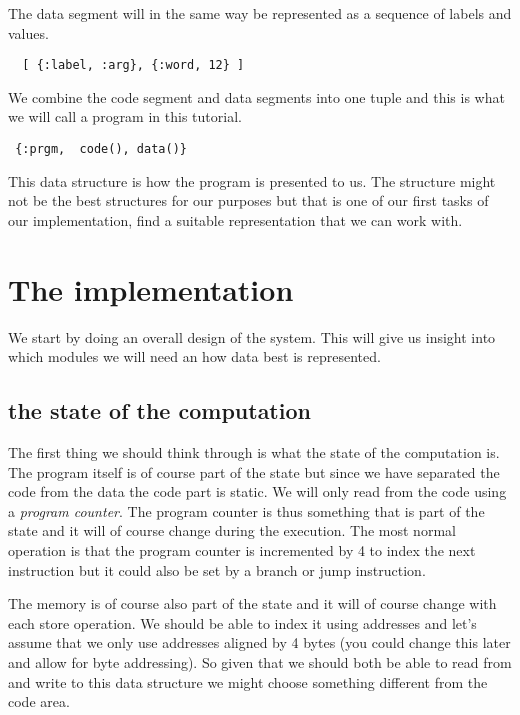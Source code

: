 \documentclass[a4paper,11pt]{article}
\begin{document}
The data segment will in the same way be represented as a sequence of
labels and values.

\begin{verbatim}
  [ {:label, :arg}, {:word, 12} ]
\end{verbatim}

We combine the code segment and data segments into one tuple and this
is what we will call a program in this tutorial.

\begin{verbatim}
 {:prgm,  code(), data()} 
\end{verbatim}

This data structure is how the program is presented to us. The
structure might not be the best structures for our purposes but that
is one of our first tasks of our implementation, find a suitable
representation that we can work with. 

\section{The implementation}

We start by doing an overall design of the system. This will give us
insight into which modules we will need an how data best is
represented.

\subsection{the state of the computation}

The first thing we should think through is what the state of the
computation is. The program itself is of course part of the state but
since we have separated the code from the data the code part is
static. We will only read from the code using a {\em program
  counter}. The program counter is thus something that is part of the
state and it will of course change during the execution. The most
normal operation is that the program counter is incremented by 4 to
index the next instruction but it could also be set by a branch or
jump instruction.

The memory is of course also part of the state and it will of course
change with each store operation. We should be able to index it using
addresses and let's assume that we only use addresses aligned by 4
bytes (you could change this later and allow for byte addressing). So
given that we should both be able to read from and write to this data
structure we might choose something different from the code area.
\end{document}
